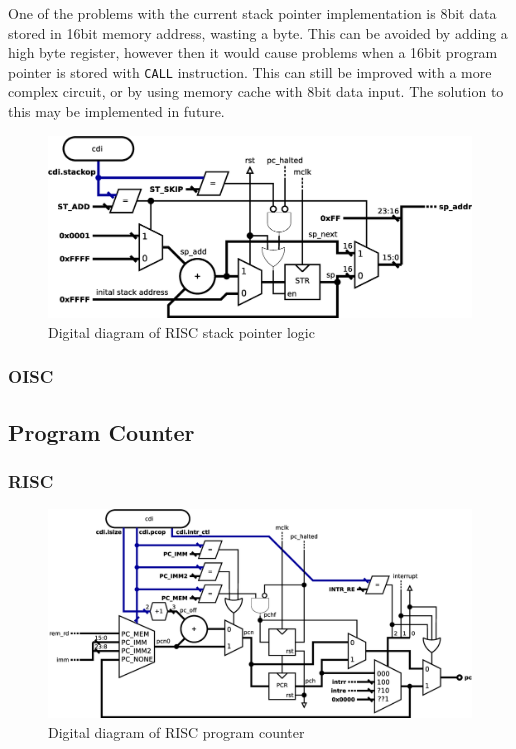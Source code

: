 One of the problems with the current stack pointer implementation is 8bit data stored in 16bit memory address, wasting a byte. This can be avoided by adding a high byte register, however then it would cause problems when a 16bit program pointer is stored with \texttt{CALL} instruction. This can still be improved with a more complex circuit, or by using memory cache with 8bit data input. The solution to this may be implemented in future.

\begin{figure}[h!]
	\centering
	\includegraphics[width=\linewidth]{../resources/risc_stack.eps}
	\caption{Digital diagram of RISC stack pointer logic}
	\label{fig:risc_stack}

\end{figure}

\subsubsection{OISC}

\subsection{Program Counter} \label{subsec:pc}

\subsubsection{RISC}

\begin{figure}[h!]
	\centering
	\includegraphics[width=\linewidth]{../resources/risc_pc.eps}
	\caption{Digital diagram of RISC program counter}
	\label{fig:risc_pc}
\end{figure}


